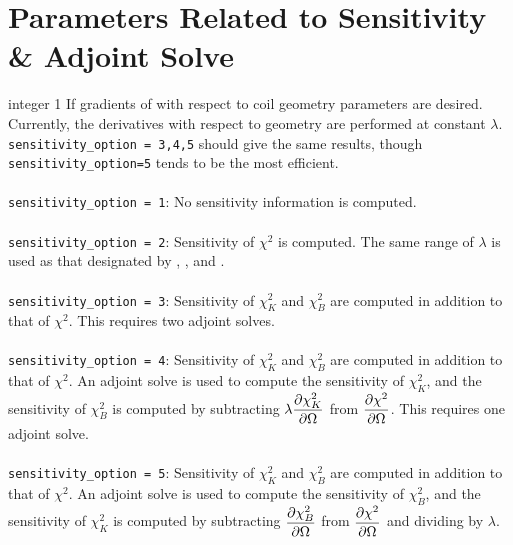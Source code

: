 \myhrule

\section{Parameters Related to Sensitivity \& Adjoint Solve}

\myhrule

{integer}
{1}
{If gradients of with respect to coil geometry parameters are desired.}
{\\ Currently, the derivatives with respect to geometry are performed at constant $\lambda$. \texttt{sensitivity\_option = 3,4,5} should give the same results, though \texttt{sensitivity\_option=5} tends to be the most efficient. \\ \\
\texttt{sensitivity\_option = 1}: No sensitivity information is computed. \\ \\
\texttt{sensitivity\_option = 2}: Sensitivity of $\chi^2$ is computed. The same range of $\lambda$ is used as that designated by , , and . \\ \\
\texttt{sensitivity\_option = 3}: Sensitivity of $\chi^2_K$ and $\chi^2_B$ are computed in addition to that of $\chi^2$. This requires two adjoint solves. \\ \\
\texttt{sensitivity\_option = 4}: Sensitivity of $\chi^2_K$ and $\chi^2_B$ are computed in addition to that of $\chi^2$. An adjoint solve is used to compute the sensitivity of $\chi^2_K$, and the sensitivity of $\chi^2_B$ is computed by subtracting $\lambda \dfrac{\partial \chi^2_K}{\partial \Omega}$ from $\dfrac{\partial \chi^2}{\partial \Omega}$. This requires one adjoint solve. \\ \\
\texttt{sensitivity\_option = 5}: Sensitivity of $\chi^2_K$ and $\chi^2_B$ are computed in addition to that of $\chi^2$. An adjoint solve is used to compute the sensitivity of $\chi^2_B$, and the sensitivity of $\chi^2_K$ is computed by subtracting $\dfrac{\partial \chi^2_B}{\partial \Omega}$ from $\dfrac{\partial \chi^2}{\partial \Omega}$ and dividing by $\lambda$. 
}

\myhrule


